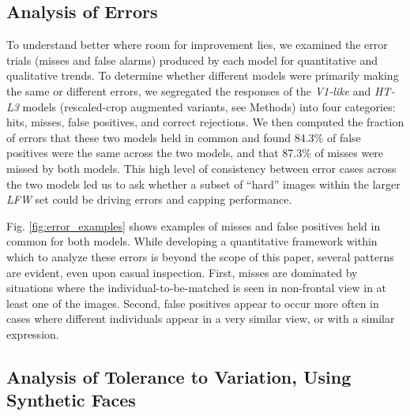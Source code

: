 \subsection{Analysis of Errors}

To understand better where room for improvement lies, we examined the error
trials (misses and false alarms) produced by each model for quantitative and
qualitative trends.  To determine whether different models were primarily making
the same or different errors, we segregated the responses of the \emph{V1-like}
and \emph{HT-L3} models (rescaled-crop augmented variants, see Methods) into
four categories: hits, misses, false positives, and correct rejections.  We then
computed the fraction of errors that these two models held in common and found
84.3\% of false positives were the same across the two models, and that
87.3\% of misses were missed by both models.  This high level of consistency
between error cases across the two models led us to ask whether a subset of
``hard'' images within the larger \emph{LFW} set could be driving errors and
capping performance.

Fig. \ref{fig:error_examples} shows examples of misses and false positives
held in common for both models.  While developing a quantitative framework
within which to analyze these errors is beyond the scope of this paper, several
patterns are evident, even upon casual inspection.  First, misses are dominated
by situations where the individual-to-be-matched is seen in non-frontal view in
at least one of the images.  Second, false positives appear to occur more often
in cases where different individuals appear in a very similar view, or with a
similar expression.


\subsection{Analysis of Tolerance to Variation, Using Synthetic Faces}


